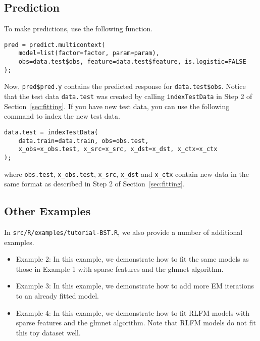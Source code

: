 \documentclass[10pt]{article}
\begin{document}
\subsection{Prediction}

To make predictions, use the following function.
{\small\begin{verbatim}
pred = predict.multicontext(
    model=list(factor=factor, param=param), 
    obs=data.test$obs, feature=data.test$feature, is.logistic=FALSE
);
\end{verbatim}}
\noindent Now, {\tt pred\$pred.y} contains the predicted response for {\tt data.test\$obs}.  Notice that the test data {\tt data.test} was created by calling {\tt indexTestData} in Step 2 of Section~\ref{sec:fitting}.  If you have new test data, you can use the following command to index the new test data.
{\small\begin{verbatim}
data.test = indexTestData(
    data.train=data.train, obs=obs.test,
    x_obs=x_obs.test, x_src=x_src, x_dst=x_dst, x_ctx=x_ctx
);
\end{verbatim}}
\noindent where {\tt obs.test}, {\tt x\_obs.test}, {\tt x\_src}, {\tt x\_dst} and {\tt x\_ctx} contain new data in the same format as described in Step 2 of Section~\ref{sec:fitting}.

\subsection{Other Examples}

In {\tt src/R/examples/tutorial-BST.R}, we also provide a number of additional examples.
\begin{itemize}
\item Example 2: In this example, we demonstrate how to fit the same models as those in Example 1 with sparse features and the glmnet algorithm.
\item Example 3: In this example, we demonstrate how to add more EM iterations to an already fitted model.
\item Example 4: In this example, we demonstrate how to fit RLFM models with sparse features and the glmnet algorithm.  Note that RLFM models do not fit this toy dataset well.
\end{itemize}




\end{document}
